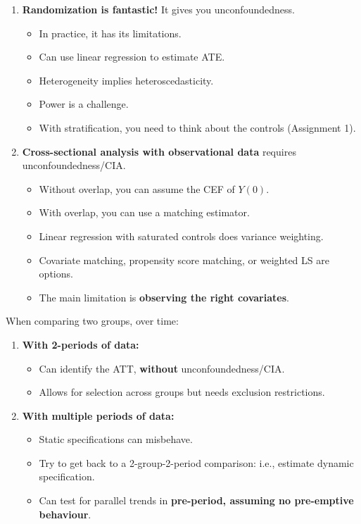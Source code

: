 \documentclass[
  letterpaper,
  DIV=11,
  numbers=noendperiod]{scrreprt}
\providecommand{\tightlist}{%
  \setlength{\itemsep}{0pt}\setlength{\parskip}{0pt}}\usepackage{longtable,booktabs,array}
\theoremstyle{definition}
\theoremstyle{remark}
\begin{document}
\begin{enumerate}
\def\labelenumi{\arabic{enumi}.}
\tightlist
\item
  \textbf{Randomization is fantastic!} It gives you unconfoundedness.

  \begin{itemize}
  \tightlist
  \item
    In practice, it has its limitations.
  \item
    Can use linear regression to estimate ATE.
  \item
    Heterogeneity implies heteroscedasticity.
  \item
    Power is a challenge.
  \item
    With stratification, you need to think about the controls
    (Assignment 1).
  \end{itemize}
\item
  \textbf{Cross-sectional analysis with observational data} requires
  unconfoundedness/CIA.

  \begin{itemize}
  \tightlist
  \item
    Without overlap, you can assume the CEF of \(Y(0)\).
  \item
    With overlap, you can use a matching estimator.
  \item
    Linear regression with saturated controls does variance weighting.
  \item
    Covariate matching, propensity score matching, or weighted LS are
    options.
  \item
    The main limitation is \textbf{observing the right covariates}.
  \end{itemize}
\end{enumerate}

When comparing two groups, over time:

\begin{enumerate}
\def\labelenumi{\arabic{enumi}.}
\tightlist
\item
  \textbf{With 2-periods of data:}

  \begin{itemize}
  \tightlist
  \item
    Can identify the ATT, \textbf{without} unconfoundedness/CIA.
  \item
    Allows for selection across groups but needs exclusion restrictions.
  \end{itemize}
\item
  \textbf{With multiple periods of data:}

  \begin{itemize}
  \tightlist
  \item
    Static specifications can misbehave.
  \item
    Try to get back to a 2-group-2-period comparison: i.e., estimate
    dynamic specification.
  \item
    Can test for parallel trends in \textbf{pre-period, assuming no
    pre-emptive behaviour}.
  \end{itemize}
\end{enumerate}
\end{document}

